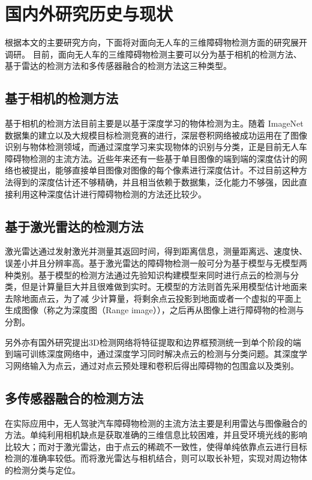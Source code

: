 \section{国内外研究历史与现状}
根据本文的主要研究方向，下面将对面向无人车的三维障碍物检测方面的研究展开调研。
目前，面向无人车的三维障碍物检测主要可以分为基于相机的检测方法、基于雷达的检测方法和多传感器融合的检测方法这三种类型。
\subsection{基于相机的检测方法}
基于相机的检测方法目前主要是以基于深度学习的物体检测为主。随着 ImageNet数据集的建立以及大规模目标检测竞赛的进行，深层卷积网络被成功运用在了图像识别与物体检测领域，而通过深度学习来实现物体的识别与分类，正是目前无人车障碍物检测的主流方法。近些年来还有一些基于单目图像的端到端的深度估计的网络也被提出，能够直接单目图像对图像的每个像素进行深度估计。不过目前这种方法得到的深度估计还不够精确，并且相当依赖于数据集，泛化能力不够强，因此直接利用这种深度估计进行障碍物检测的方法还比较少。
\subsection{基于激光雷达的检测方法}
激光雷达通过发射激光并测量其返回时间，得到距离信息，测量距离远、速度快、误差小并且分辨率高。基于激光雷达的障碍物检测一般可分为基于模型与无模型两种类别。基于模型的检测方法通过先验知识构建模型来同时进行点云的检测与分类，但是计算量巨大并且很难做到实时。无模型的方法则首先采用模型估计地面来去除地面点云，为了减 少计算量，将剩余点云投影到地面或者一个虚拟的平面上生成图像（称之为深度图（Range image）），之后再从图像上进行障碍物的检测与分割。

另外亦有国外研究提出3D检测网络将特征提取和边界框预测统一到单个阶段的端到端可训练深度网络中，通过深度学习同时解决点云的检测与分类问题。其深度学习网络输入为点云，通过对点云预处理和卷积后得出障碍物的包围盒以及类别。

\subsection{多传感器融合的检测方法}
在实际应用中，无人驾驶汽车障碍物检测的主流方法主要是利用雷达与图像融合的方法。单纯利用相机缺点是获取准确的三维信息比较困难，并且受环境光线的影响比较大；而对于激光雷达，由于点云的稀疏不一致性，使得单纯依靠点云进行目标检测的准确率较低。而将激光雷达与相机结合，则可以取长补短，实现对周边物体的检测分类与定位。

